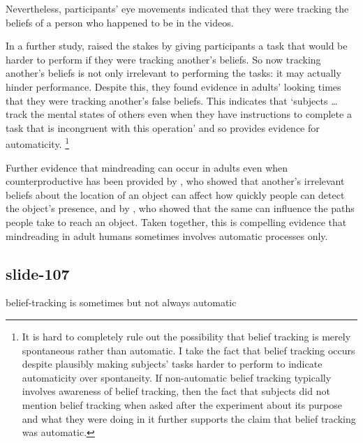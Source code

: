 \documentclass[12pt,\papersize]{extarticle}
\begin{document}
Nevertheless, participants’ eye movements indicated that they were tracking the beliefs of a person who happened to be in the videos.

In a further study, \citet{schneider:2014_task} raised the stakes by giving participants a task that would be harder to perform if they were tracking another’s beliefs.
So now tracking another’s beliefs is not only irrelevant to performing the tasks: it may actually hinder performance.
Despite this, they found evidence in adults’ looking times that they were tracking another’s false beliefs.
This indicates that ‘subjects … track the mental states of others even when they have instructions to complete a task that is incongruent with this operation’ \citep[p.~46]{schneider:2014_task} and so provides evidence for automaticity.%
\footnote{%
It is hard to completely rule out the possibility that belief tracking is merely spontaneous rather than automatic.
I take the fact that belief tracking occurs despite plausibly making subjects’ tasks harder to perform to indicate automaticity over spontaneity.
If non-automatic belief tracking typically involves awareness of belief tracking, then the fact that subjects did not mention belief tracking when asked after the experiment about its purpose and what they were doing in it further supports the claim that belief tracking was automatic.
}

Further evidence that mindreading can occur in adults even when counterproductive has been provided by \citet{kovacs_social_2010}, who showed that another’s irrelevant beliefs about the location of an object can affect how quickly people can detect the object’s presence,
and by \citet{Wel:2013uq}, who showed that the same can influence the paths people take to reach an object.
Taken together, this is compelling evidence that mindreading in adult humans sometimes involves automatic processes only.

\subsection{slide-107}
belief-tracking is sometimes  but not always automatic
\end{document}
